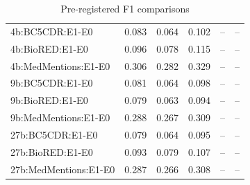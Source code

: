 \begin{table}[t]
\begin{tabular}{llllll}
4b:BC5CDR:E1-E0 & 0.083 & 0.064 & 0.102 & -- & -- \\
4b:BioRED:E1-E0 & 0.096 & 0.078 & 0.115 & -- & -- \\
4b:MedMentions:E1-E0 & 0.306 & 0.282 & 0.329 & -- & -- \\
9b:BC5CDR:E1-E0 & 0.081 & 0.064 & 0.098 & -- & -- \\
9b:BioRED:E1-E0 & 0.079 & 0.063 & 0.094 & -- & -- \\
9b:MedMentions:E1-E0 & 0.288 & 0.267 & 0.309 & -- & -- \\
27b:BC5CDR:E1-E0 & 0.079 & 0.064 & 0.095 & -- & -- \\
27b:BioRED:E1-E0 & 0.093 & 0.079 & 0.107 & -- & -- \\
27b:MedMentions:E1-E0 & 0.287 & 0.266 & 0.308 & -- & -- \\
\hline
\end{tabular}
\caption{Pre-registered F1 comparisons}
\label{tab:f1_comparisons}
\end{table}
